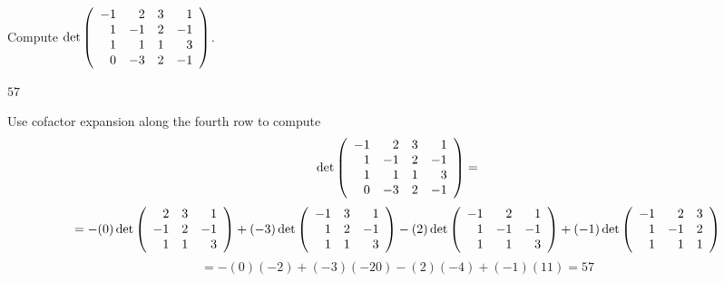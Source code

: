 \documentclass{ximera}
\author{Marty Golubitsky}
\begin{document}

\begin{exercise}\label{c10.1.5c}

Compute \quad $\det\left(\begin{array}{rrrrrrrrrrrrrrrrrr} -1 & 2 & 3 & 1\\ 1 & -1 & 2 & -1\\ 1 & 1 & 1& 3\\ 0 & -3 & 2 & -1 \end{array}\right) $.
  
\begin{solution}

\ans $57$

\soln Use cofactor expansion along the fourth row to compute
\[
\det\left(\begin{array}{rrrrrrrrrrrrrrrrrr} -1 & 2 & 3 & 1\\ 1 & -1 & 2 & -1\\ 1 & 1 & 1& 3\\ 0 & -3 & 2 & -1 \end{array}\right) = 
\]
\[
= -(0)\det\left(\begin{array}{rrrrrrrrrrrrrrrrrr} 2 & 3 & 1\\ -1 & 2 &  -1\\  1 & 1 & 3 \end{array}\right) 
+(-3)\det\left(\begin{array}{rrrrrrrrrrrrrrrrrr} -1 & 3 & 1\\ 1 & 2 &  -1\\  1& 1 & 3 \end{array}\right) 
-(2)\det\left(\begin{array}{rrrrrrrrrrrrrrrrrr} -1 & 2 & 1\\ 1 & -1 &  -1\\  1 & 1 & 3 \end{array}\right) 
+(-1)\det\left(\begin{array}{rrrrrrrrrrrrrrrrrr} -1 & 2 & 3\\ 1 & -1 &  2\\  1& 1 & 1 \end{array}\right) 
\]
\[
 = -(0)(-2) + (-3)(-20) - (2)(-4)  + (-1)(11) =   57
\]
\end{solution}
\end{exercise}
\end{document}
